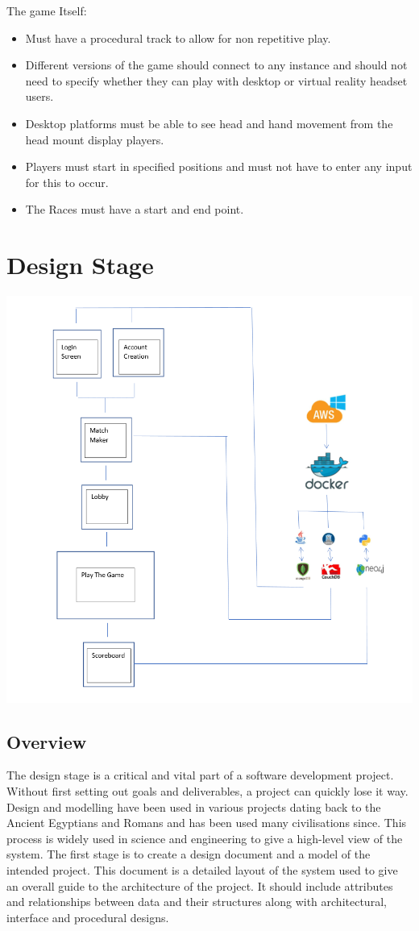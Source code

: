 The game Itself:
\begin{itemize}
\item Must have a procedural track to allow for non repetitive play.
\item Different versions of the game should connect to any instance and should not need to specify whether they can play with desktop or virtual reality headset users.
\item Desktop platforms must be able to see head and hand movement from the head mount display players.
\item Players must start in specified positions and must not have to enter any input for this to occur.
\item The Races must have a start and end point.
\end{itemize}

\newpage
\section{Design Stage}

\includegraphics[width=1\columnwidth]{img/Overview.PNG}
\subsection {Overview}
The design stage is a critical and vital part of a software development project. Without first setting out goals and deliverables, a project can quickly lose it way. Design and modelling have been used in various projects dating back to the Ancient Egyptians and Romans and has been used many civilisations since. This process is widely used in science and engineering to give a high-level view of the system.
The first stage is to create a design document and a model of the intended project. This document is a detailed layout of the system used to give an overall guide to the architecture of the project. It should include attributes and relationships between data and their structures along with architectural, interface and procedural designs.

